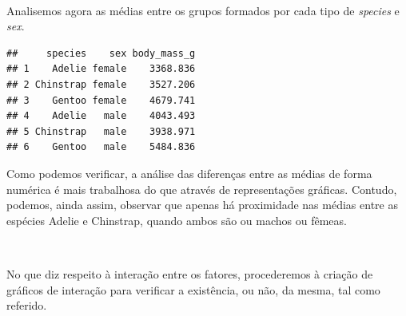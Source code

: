 \documentclass[]{article}
\begin{document}
\(\ \)

Analisemos agora as médias entre os grupos formados por cada tipo de
\emph{species} e \emph{sex}.

\begin{Shaded}
\begin{Highlighting}[]
\SpecialCharTok{\textasciitilde{}}\SpecialCharTok{*}
\end{Highlighting}
\end{Shaded}

\begin{verbatim}
##     species    sex body_mass_g
## 1    Adelie female    3368.836
## 2 Chinstrap female    3527.206
## 3    Gentoo female    4679.741
## 4    Adelie   male    4043.493
## 5 Chinstrap   male    3938.971
## 6    Gentoo   male    5484.836
\end{verbatim}

Como podemos verificar, a análise das diferenças entre as médias de
forma numérica é mais trabalhosa do que através de representações
gráficas. Contudo, podemos, ainda assim, observar que apenas há
proximidade nas médias entre as espécies Adelie e Chinstrap, quando
ambos são ou machos ou fêmeas.

\(\ \)

No que diz respeito à interação entre os fatores, procederemos à criação
de gráficos de interação para verificar a existência, ou não, da mesma,
tal como referido.
\end{document}

